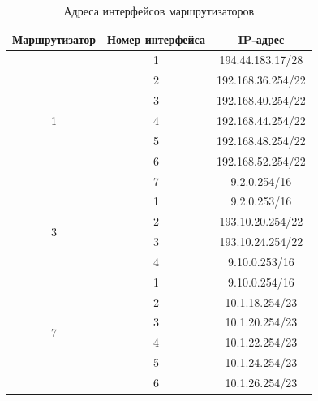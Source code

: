\documentclass[a4paper, 14pt]{extarticle}
\begin{document}
\begin{table}[H]
  \centering
  \setlength{\tabcolsep}{20pt}
  \caption{Адреса интерфейсов маршрутизаторов}
  \begin{tabular}{|c|c|c|}
    \hline
    Маршрутизатор      & Номер интерфейса & IP-адрес          \\
    \hline
    \multirow{7}{*}{1} & 1                & 194.44.183.17/28  \\
    \cline{2-3}
                       & 2                & 192.168.36.254/22 \\
    \cline{2-3}
                       & 3                & 192.168.40.254/22 \\
    \cline{2-3}
                       & 4                & 192.168.44.254/22 \\
    \cline{2-3}
                       & 5                & 192.168.48.254/22 \\
    \cline{2-3}
                       & 6                & 192.168.52.254/22 \\
    \cline{2-3}
                       & 7                & 9.2.0.254/16      \\
    \hline
    \multirow{4}{*}{3} & 1                & 9.2.0.253/16      \\
    \cline{2-3}
                       & 2                & 193.10.20.254/22  \\
    \cline{2-3}
                       & 3                & 193.10.24.254/22  \\
    \cline{2-3}
                       & 4                & 9.10.0.253/16     \\
    \hline
    \multirow{6}{*}{7} & 1                & 9.10.0.254/16     \\
    \cline{2-3}
                       & 2                & 10.1.18.254/23    \\
    \cline{2-3}
                       & 3                & 10.1.20.254/23    \\
    \cline{2-3}
                       & 4                & 10.1.22.254/23    \\
    \cline{2-3}
                       & 5                & 10.1.24.254/23    \\
    \cline{2-3}
                       & 6                & 10.1.26.254/23    \\
    \hline
  \end{tabular}
\end{table}
\end{document}
